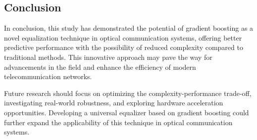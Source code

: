 \subsection{Conclusion}
In conclusion, this study has demonstrated the potential of gradient boosting as a novel equalization technique in optical communication systems, offering better predictive performance with the possibility of reduced complexity compared to traditional methods. This innovative approach may pave the way for advancements in the field and enhance the efficiency of modern telecommunication networks.

Future research should focus on optimizing the complexity-performance trade-off, investigating real-world robustness, and exploring hardware acceleration opportunities. Developing a universal equalizer based on gradient boosting could further expand the applicability of this technique in optical communication systems.